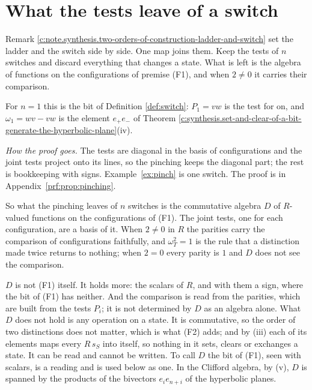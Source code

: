 \documentclass[11pt]{article}
\theoremstyle{definition}
\theoremstyle{plain}
\begin{document}
\section{What the tests leave of a switch}

\label{c:note.geometry-first.setting-what-tests-leave-switch}
Remark \ref{c:note.synthesis.two-orders-of-construction-ladder-and-switch} set the ladder and the switch side by side. One map joins them. Keep the tests of $n$ switches and discard everything that changes a state. What is left is the algebra of functions on the configurations of premise (F1), and when $2 \neq 0$ it carries their comparison.

\label{c:note.geometry-first.setting-what-tests-leave-switch-2}
For $n = 1$ this is the bit of Definition \ref{def:switch}: $P_{1} = vw$ is the test for on, and $\omega_{1} = wv - vw$ is the element $e_{+}e_{-}$ of Theorem \ref{c:synthesis.set-and-clear-of-a-bit-generate-the-hyperbolic-plane}(iv).

\label{c:note.geometry-first.setting-what-tests-leave-switch-3}
\noindent\emph{How the proof goes.} The tests are diagonal in the basis of configurations and the joint tests project onto its lines, so the pinching keeps the diagonal part; the rest is bookkeeping with signs. Example~\ref{ex:pinch} is one switch. The proof is in Appendix~\ref{prf:prop:pinching}.

So what the pinching leaves of $n$ switches is the commutative algebra $D$ of $R$-valued functions on the configurations of (F1). The joint tests, one for each configuration, are a basis of it. When $2 \neq 0$ in $R$ the parities carry the comparison of configurations faithfully, and $\omega_{T}^{2} = 1$ is the rule that a distinction made twice returns to nothing; when $2 = 0$ every parity is $1$ and $D$ does not see the comparison.

\label{c:note.geometry-first.setting-what-tests-leave-switch-4}
$D$ is not (F1) itself. It holds more: the scalars of $R$, and with them a sign, where the bit of (F1) has neither. And the comparison is read from the parities, which are built from the tests $P_{i}$; it is not determined by $D$ as an algebra alone. What $D$ does not hold is any operation on a state. It is commutative, so the order of two distinctions does not matter, which is what (F2) adds; and by (iii) each of its elements maps every $R\,s_{S}$ into itself, so nothing in it sets, clears or exchanges a state. It can be read and cannot be written. To call $D$ the bit of (F1), seen with scalars, is a reading and is used below as one. In the Clifford algebra, by (v), $D$ is spanned by the products of the bivectors $e_{i}e_{n+i}$ of the hyperbolic planes.
\end{document}
